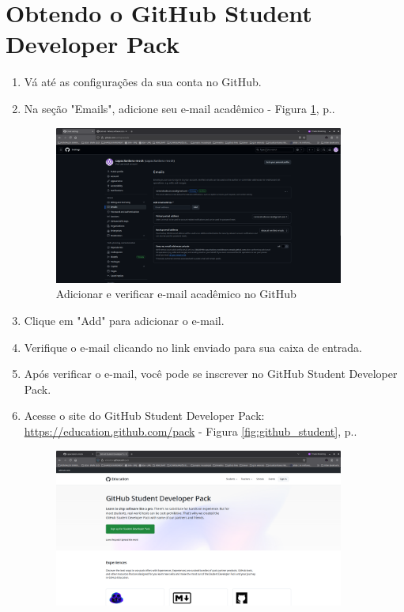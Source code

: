 \section{Obtendo o GitHub Student Developer Pack}
\begin{enumerate}
  \item Vá até as configurações da sua conta no GitHub.
  \item Na seção "Emails", adicione seu e-mail acadêmico - Figura \ref{fig:adding_academic_email}, p.\pageref{fig:adding_academic_email}.
  \begin{figure}[H]
    \centering
    \includegraphics[width=0.9\textwidth]{./assets/images/03_adding_academic_email.png}
    \caption{Adicionar e verificar e-mail acadêmico no GitHub}
    \label{fig:adding_academic_email}
  \end{figure}
  \item Clique em "Add" \; para adicionar o e-mail.
  \item Verifique o e-mail clicando no link enviado para sua caixa de entrada.
  \item Após verificar o e-mail, você pode se inscrever no GitHub Student Developer Pack.
  \item Acesse o site do GitHub Student Developer Pack: \url{https://education.github.com/pack} - Figura \ref{fig:github_student}, p.\pageref{fig:github_student}.
  \begin{figure}[H]
    \centering
    \includegraphics[width=0.9\textwidth]{./assets/images/04_gsdp_page.png}

\end{figure}
\end{enumerate}
